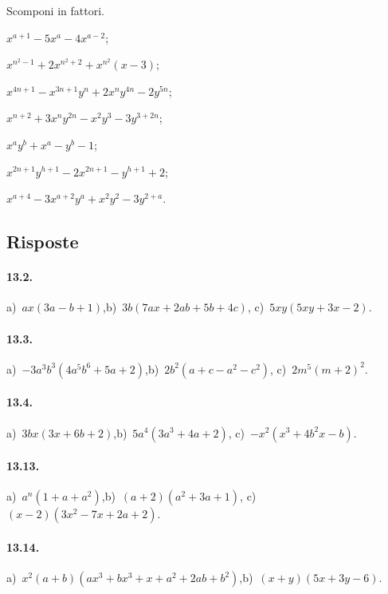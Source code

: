 \begin{esercizio}[\Ast]
 \label{ese:13.122}
 Scomponi in fattori.
 \begin{multicols}{2}
 \begin{enumeratea}
  \item $x^{a+1}-5x^{a}-4x^{a-2}$;
\item $x^{n^{2}-1}+2x^{n^{2}+2}+x^{n^{2}}(x-3)$;
\item $x^{4n+1}-x^{3n+1}y^{n}+2x^{n}y^{4n}-2y^{5n}$;
\item $x^{n+2}+3x^{n}y^{2n}-x^{2}y^{3}-3y^{3+2n}$;
\item $x^{a}y^{b}+x^{a}-y^{b}-1$;
\item $x^{2n+1}y^{h+1}-2x^{2n+1}-y^{h+1}+2$;
\item $x^{a+4}-3x^{a+2}y^{a}+x^{2}y^{2}-3y^{2+a}$.
 \end{enumeratea}
 \end{multicols}
\end{esercizio}

\subsection{Risposte}

\paragraph{13.2.}
a)~$ax(3a-b+1)$,\quad b)~$3b(7ax+2ab+5b+4c)$, \quad c)~$5xy(5xy+3x-2)$.

\paragraph{13.3.}
a)~$-3a^{3}b^{3}\left(4a^{5}b^{6}+5a+2\right)$,\quad b)~$2b^{2}(a+c-a^{2}-c^{2})$, \quad c)~$2m^{5}\left(m+2\right)^{2}$.

\paragraph{13.4.}
a)~$3bx(3x+6b+2)$,\quad b)~$5a^{4}\left(3a^{3}+4a+2\right)$, \quad c)~$-x^{2}\left(x^{3}+4b^{2}x-b\right)$.

\paragraph{13.13.}
a)~$a^{n}(1+a+a^{2})$,\quad b)~$(a+2)\left(a^{2}+3a+1\right)$, \quad c)~$(x-2)\left(3x^2-7x+2a+2\right)$.

\paragraph{13.14.}
a)~$x^{2}(a+b)(ax^{3}+bx^{3}+x+a^{2}+2ab+b^{2})$,\quad b)~$(x+y)\left(5x+3y-6\right)$.

